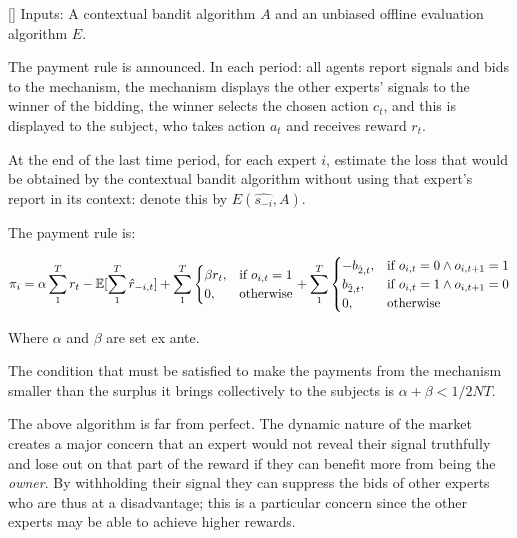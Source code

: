 \begin{mech}\label{mech:bidbandit}[]
Inputs: A contextual bandit algorithm $A$ and an unbiased offline evaluation algorithm $E$.


The payment rule is announced.
 In each period: all agents report signals and bids to the mechanism, the mechanism displays the other experts' signals to the winner of the bidding, the winner selects the chosen action $c_t$, and this is displayed to the subject, who takes action $a_t$ and receives reward $r_t$.

At the end of the last time period, for each expert $i$, estimate the loss that would be obtained by the contextual bandit algorithm without using that expert's report in its context: denote this by $E(\hat{s_{-i}},A)$.

The payment rule is:

\[
    \pi_i = 
\alpha \sum_1^T r_t -  \expec[\sum_1^T \hat{r}_{-i,t}]
+
\sum_1^T
\begin{cases}
    \beta r_t ,& \text{if } o_{i,t} = 1\\
     0,              & \text{otherwise}
\end{cases}
+
\sum_1^T
\begin{cases}
     - b_{\hat{2},t} ,& \text{if } o_{i,t} = 0 \land o_{i,t+1} = 1\\
       b_{\hat{2},t} ,& \text{if } o_{i,t} = 1 \land o_{i,t+1} = 0 \\
	   0,              & \text{otherwise}
\end{cases}
\]

Where $\alpha$ and $\beta$ are set ex ante. 
\end{mech}


The condition that must be satisfied to make the payments from the mechanism smaller than the surplus it brings collectively to the subjects is $ \alpha + \beta < 1/2NT$.


The above algorithm is far from perfect.
The dynamic nature of the market creates a major concern that an expert would not reveal their signal truthfully and lose out on that part of the reward if they can benefit more from being the \emph{owner}.
By withholding their signal they can suppress the bids of other experts who are thus at a disadvantage; this is a particular concern since the other experts may be able to achieve higher rewards.

